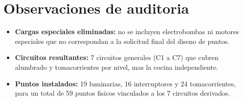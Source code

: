 \section{Observaciones de auditoria}

\begin{itemize}
  \item \textbf{Cargas especiales eliminadas:} no se incluyen electrobombas ni motores especiales que no correspondan a la solicitud final del diseno de puntos.
  \item \textbf{Circuitos resultantes:} 7 circuitos generales (C1 a C7) que cubren alumbrado y tomacorrientes por nivel, mas la cocina independiente.
  \item \textbf{Puntos instalados:} 19 luminarias, 16 interruptores y 24 tomacorrientes, para un total de 59 puntos fisicos vinculados a los 7 circuitos derivados.
\end{itemize}
